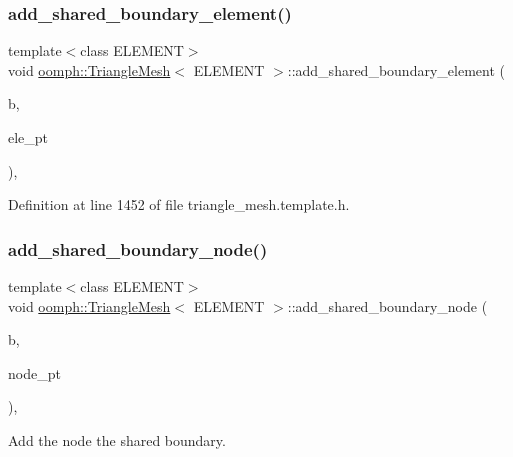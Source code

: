 \subsubsection{\texorpdfstring{add\+\_\+shared\+\_\+boundary\+\_\+element()}{add\_shared\_boundary\_element()}}
{\footnotesize\ttfamily template$<$class E\+L\+E\+M\+E\+NT$>$ \\
void \hyperlink{classoomph_1_1TriangleMesh}{oomph\+::\+Triangle\+Mesh}$<$ E\+L\+E\+M\+E\+NT $>$\+::add\+\_\+shared\+\_\+boundary\+\_\+element (\begin{DoxyParamCaption}\item[{const unsigned \&}]{b,  }\item[{\hyperlink{classoomph_1_1FiniteElement}{Finite\+Element} $\ast$}]{ele\+\_\+pt }\end{DoxyParamCaption})\hspace{0.3cm}{\ttfamily [inline]}, {\ttfamily [protected]}}



Definition at line 1452 of file triangle\+\_\+mesh.\+template.\+h.

\mbox{\label{classoomph_1_1TriangleMesh_a56132de18ed5754ac30202036025347b}} 
\subsubsection{\texorpdfstring{add\+\_\+shared\+\_\+boundary\+\_\+node()}{add\_shared\_boundary\_node()}}
{\footnotesize\ttfamily template$<$class E\+L\+E\+M\+E\+NT$>$ \\
void \hyperlink{classoomph_1_1TriangleMesh}{oomph\+::\+Triangle\+Mesh}$<$ E\+L\+E\+M\+E\+NT $>$\+::add\+\_\+shared\+\_\+boundary\+\_\+node (\begin{DoxyParamCaption}\item[{const unsigned \&}]{b,  }\item[{\hyperlink{classoomph_1_1Node}{Node} $\ast$}]{node\+\_\+pt }\end{DoxyParamCaption})\hspace{0.3cm}{\ttfamily [inline]}, {\ttfamily [protected]}}



Add the node the shared boundary. 



